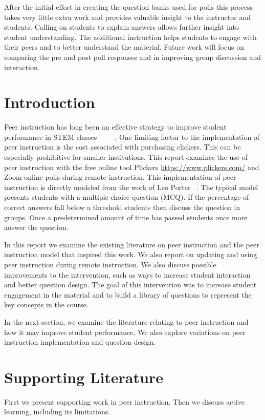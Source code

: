 \documentclass[12pt]{article}
\begin{document}
After the initial effort in creating the question banks used for polls this process takes very little extra work and provides valuable insight to the instructor and students.  Calling on students to explain answers allows further insight into student understanding.  The  additional instruction helps students to engage with their peers and to better understand the material.  Future work will focus on comparing the pre and post poll responses and in improving group discussion and interaction.
 
\section{Introduction}
Peer instruction has long been an effective strategy to improve student performance in STEM classes ~\cite{porterMultiinstitutionalStudyPeer2016} ~\cite{porterHalvingFailRates2013} ~\cite{simonExperienceReportPeer2010a}. One limiting factor to the implementation of peer instruction is the cost associated with purchasing clickers.  This can be especially prohibitive for smaller institutions.  
This report examines the use of peer instruction with the free online tool Plickers \url{https://www.plickers.com/} and Zoom online polls during remote instruction.  
This implementation of peer instruction is directly modeled from the work of Leo Porter ~\cite{porterMultiinstitutionalStudyPeer2016}.  The typical model presents students with a multiple-choice question (MCQ). If the percentage of correct answers fall below a threshold students then discuss the question in groups. Once a predetermined amount of time has passed students once more answer the question.

In this report we examine the existing literature on peer instruction and the peer instruction model that inspired this work.  We also report on updating and using peer instruction during remote instruction.  We also discuss possible improvements to the intervention, such as ways to increase student interaction and better question design. The goal of this intervention was to increase student engagement in the material and to build a library of questions to represent the key concepts in the course. 

In the next section, we examine the literature relating to peer instruction and how it may improve student performance.  We also explore variations on peer instruction implementation and question design. 

\section{Supporting Literature}
First we present supporting work in peer instruction.  Then we discuss active learning, including its limitations. 
\end{document}
